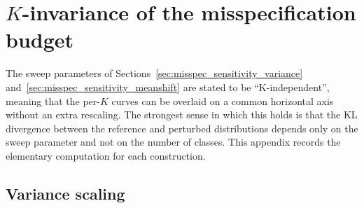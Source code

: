 \chapter{$K$-invariance of the misspecification budget}\label{app:kl_invariance}

The sweep parameters of Sections~\ref{sec:misspec_sensitivity_variance} and~\ref{sec:misspec_sensitivity_meanshift} are stated to be ``K-independent'', meaning that the per-$K$ curves can be overlaid on a common horizontal axis without an extra rescaling. The strongest sense in which this holds is that the KL divergence between the reference and perturbed distributions depends only on the sweep parameter and not on the number of classes. This appendix records the elementary computation for each construction.

\section{Variance scaling}


